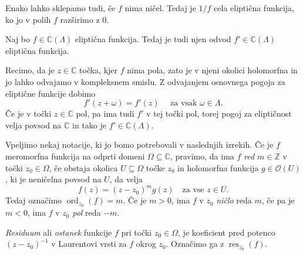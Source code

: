 \documentclass[mat1]{fmfdelo}
\numberwithin{equation}{section}
\newcommand{\Z}{\mathbb Z}
\newcommand{\C}{\mathbb C}
\newcommand{\inv}{^{-1}}
\newcommand{\torus}{\C/\Lambda}
\newcommand{\elf}{\C(\Lambda)}
\newcommand{\res}[2]{\operatorname{res}_{#1}(#2)}
\newcommand{\ord}[2]{\operatorname{ord}_{#1}(#2)}
\newcommand{\hol}[1]{\mathcal{O}(#1)}
\theoremstyle{definition}
\newenvironment{komentar}[1][Komentar]{\begin{proof}[#1]\let\qed\relax}{\end{proof}}
\begin{document}
\begin{opomba}
    Enako lahko sklepamo tudi, če $f$ nima ničel. Tedaj je $1/f$ cela eliptična funkcija, ko jo v polih $f$ razširimo z $0$.
\end{opomba}

\begin{lema}
    \label{odvod el. funkcije}
    Naj bo $f \in \elf$ eliptična funkcija. Tedaj je tudi njen odvod $f' \in \elf$ eliptična funkcija.
\end{lema}

\begin{dokaz}
    Recimo, da je $z \in \C$ točka, kjer $f$ nima pola, zato je v njeni okolici holomorfna in jo lahko odvajamo v kompleksnem smislu. Z odvajanjem osnovnega pogoja za eliptične funkcije dobimo
    \[
        f'(z + \omega) = f'(z) \quad \text{ za vsak $\omega \in \Lambda$.}
    \]
    Če je v točki $z \in \C$ pol, pa ima tudi $f'$ v tej točki pol, torej pogoj za eliptičnost velja povsod na $\C$ in tako je $f' \in \elf$.
\end{dokaz}

Vpeljimo nekaj notacije, ki jo bomo potrebovali v naslednjih izrekih. Če je $f$ meromorfna funkcija na odprti domeni $\Omega \subseteq \C$, pravimo, da ima $f$ \emph{red $m \in \Z$} v točki $z_0 \in \Omega$, če obstaja okolica $U \subseteq \Omega$ točke $z_0$ in holomorfna funkcija $g \in \hol{U}$, ki je neničelna povsod na $U$, da velja 
\[
    f(z) = (z - z_0)^m g(z) \quad \text{za vse $z \in U$.}  
\]   
Tedaj označimo $\ord{z_0}{f} = m$. Če je $m > 0$, ima $f$ v $z_0$ \emph{ničlo} reda $m$, če pa je $m < 0$, ima $f$ v $z_0$ \emph{pol} reda $-m$.

\emph{Residuum} ali \emph{ostanek} funkcije $f$ pri točki $z_0 \in \Omega$, je koeficient pred potenco $(z-z_0)\inv$ v Laurentovi vrsti za $f$ okrog $z_0$. Označimo ga z $\res{z_0}{f}$. 

\end{document}
